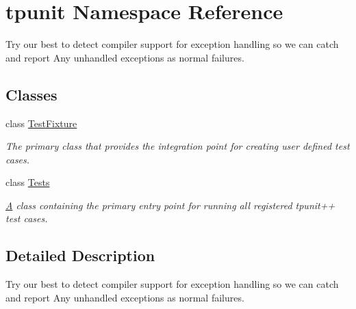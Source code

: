 \hypertarget{namespacetpunit}{}\section{tpunit Namespace Reference}
\label{namespacetpunit}


Try our best to detect compiler support for exception handling so we can catch and report Any unhandled exceptions as normal failures.  


\subsection*{Classes}
\begin{DoxyCompactItemize}
\item 
class \mbox{\hyperlink{classtpunit_1_1TestFixture}{Test\+Fixture}}
\begin{DoxyCompactList}\small\item\em The primary class that provides the integration point for creating user defined test cases. \end{DoxyCompactList}\item 
class \mbox{\hyperlink{classtpunit_1_1Tests}{Tests}}
\begin{DoxyCompactList}\small\item\em \mbox{\hyperlink{structA}{A}} class containing the primary entry point for running all registered tpunit++ test cases. \end{DoxyCompactList}\end{DoxyCompactItemize}


\subsection{Detailed Description}
Try our best to detect compiler support for exception handling so we can catch and report Any unhandled exceptions as normal failures. 